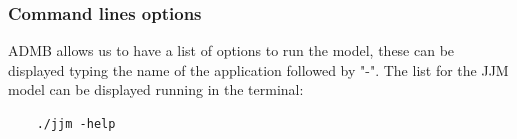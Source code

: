 \documentclass{article}
\begin{document}
\subsubsection{Command lines options}
ADMB allows us to have a list of options to run the model, these can be displayed typing the name of the application followed by "-". The list for the  JJM model can be displayed running in the terminal:
\begin{lstlisting}
    ./jjm -help
\end{lstlisting}
\end{document}
